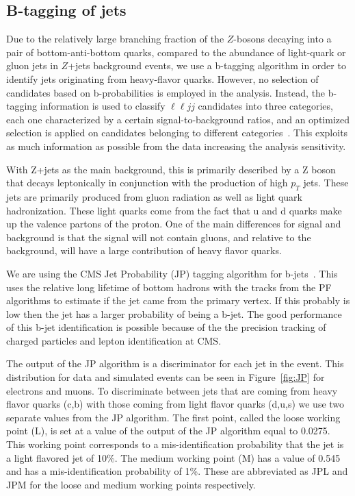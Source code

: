 \subsection{B-tagging of jets}
\label{subsec:btaggingofjets}
Due to the relatively large branching fraction of the $Z$-bosons decaying into a pair of bottom-anti-bottom quarks, compared to the abundance of light-quark or gluon jets in $Z$+jets background events, we use a b-tagging algorithm in order to identify jets originating from heavy-flavor quarks. However, no selection of candidates based on b-probabilities is employed in the analysis. Instead, the b-tagging information is used to classify $\ell \ell jj$ candidates into three categories, each one characterized by a certain signal-to-background ratios, and an optimized selection is applied on candidates belonging to different categories~\cite{CMS-AN-2011-399}. This exploits as much information as possible from the data increasing the analysis sensitivity.

With Z+jets as the main background, this is primarily described by a Z boson that decays leptonically in conjunction with the production of high $p_T$ jets. These jets are primarily produced from gluon radiation as well as light quark hadronization.  These light quarks come from the fact that u and d quarks make up the valence partons of the proton. One of the main differences for signal and background is that the signal will not contain gluons, and relative to the background, will have a large contribution of heavy flavor quarks.

We are using the CMS Jet Probability (JP) tagging algorithm for b-jets~\cite{CMS-PAS-BTV-11-004}.  This uses the relative long lifetime of bottom hadrons with the tracks from the PF algorithms to estimate if the jet came from the primary vertex.  If this probably is low then the jet has a larger probability of being a b-jet.  The good performance of this b-jet identification is possible because of the the precision tracking of charged particles and lepton identification at CMS.

The output of the JP algorithm is a discriminator for each jet in the event.  This distribution for data and simulated events can be seen in Figure~\ref{fig:JP} for electrons and muons.  To discriminate between jets that are coming from heavy flavor quarks (c,b) with those coming from light flavor quarks (d,u,s) we use two separate values from the JP algorithm.  The first point, called the loose working point (L), is set at a value of the output of the JP algorithm equal to 0.0275. This working point corresponds to a mis-identification probability that the jet is a light flavored jet of 10\%.  The medium working point (M) has a value of 0.545 and has a mis-identification probability of 1\%.  These are abbreviated as JPL and JPM for the loose and medium working points respectively.


